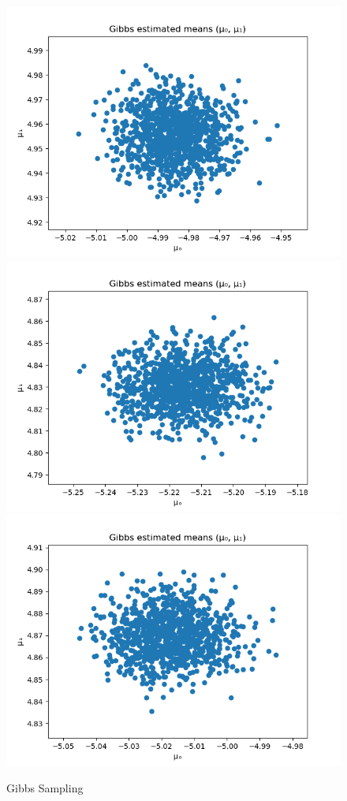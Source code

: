 \begin{figure}
	\includegraphics[scale=0.5]{gibbs-estimated-means-4.png}
	\includegraphics[scale=0.5]{gibbs-estimated-means-5.png}
	\includegraphics[scale=0.5]{gibbs-estimated-means-6.png}
	\caption{Gibbs Sampling}
	\label{gibbs-figure}
\end{figure}